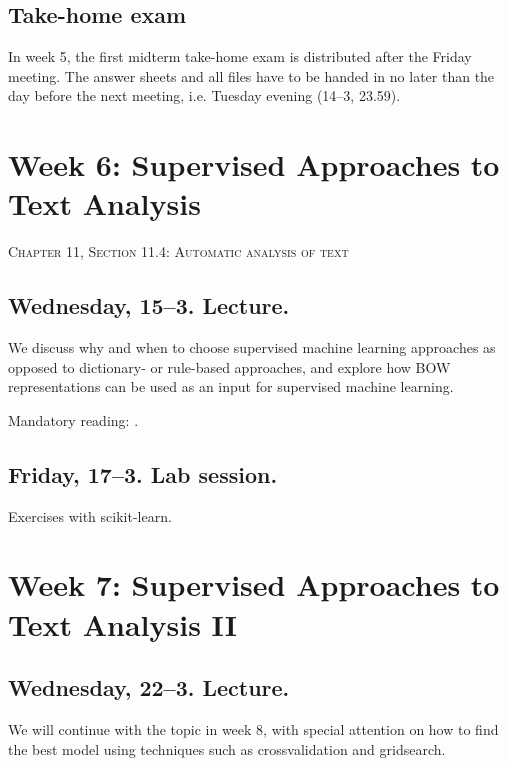 \subsection*{Take-home exam}
In week 5, the first midterm take-home exam is distributed after the Friday meeting. The answer sheets and all files have to be handed in no later than the day before the next meeting, i.e. Tuesday evening (14--3, 23.59).






\section*{Week 6: Supervised Approaches to Text Analysis}
\textsc{ Chapter 11, Section 11.4: Automatic analysis of text}\\


\subsection*{Wednesday, 15--3. Lecture.}
We discuss why and when to choose supervised machine learning approaches as opposed to dictionary- or rule-based approaches, and explore how BOW representations can be used as an input for supervised machine learning.

Mandatory reading: \cite{Boumans2016}.


\subsection*{Friday, 17--3. Lab session.}
Exercises with scikit-learn.





\section*{Week 7: Supervised Approaches to Text Analysis II}


\subsection*{Wednesday, 22--3. Lecture.}
We will continue with the topic in week 8, with special attention on how to find the best model using techniques such as crossvalidation and gridsearch.

